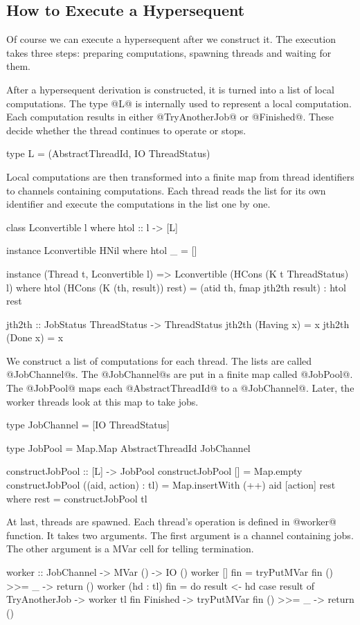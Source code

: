 \documentclass[doctor]{iscs-thesis}
\begin{document}
\subsection{How to Execute a Hypersequent}
Of course we can execute a hypersequent after we construct it.  The
execution takes three steps: preparing computations, spawning
threads and waiting for them.

After a hypersequent derivation is constructed, it is turned into a list
of local computations.  The type @L@ is internally used to represent a
local computation.  Each computation results in either @TryAnotherJob@
or @Finished@.  These decide whether the thread continues to operate or stops.
\begin{code}
type L = (AbstractThreadId, IO ThreadStatus)
\end{code}

Local computations are then transformed into a finite map from thread
identifiers to channels containing computations. Each thread reads the list for
its own identifier and execute the computations in the list one by one. 
\begin{code}
class Lconvertible l where
    htol :: l -> [L]

instance Lconvertible HNil where
    htol _ = []

instance (Thread t, Lconvertible l) =>
 Lconvertible (HCons (K t ThreadStatus) l) where
    htol (HCons (K (th, result)) rest) =
      (atid th, fmap jth2th result) : htol rest

jth2th :: JobStatus ThreadStatus -> ThreadStatus 
jth2th (Having x) = x
jth2th (Done x) = x 
\end{code}

We construct a list of computations for each thread.  The lists are
called @JobChannel@s.  The @JobChannel@s are put in a finite map called
@JobPool@.  The @JobPool@ maps each @AbstractThreadId@ to a
@JobChannel@.  Later, the worker threads look at this map to take jobs.
\begin{code}
type JobChannel = [IO ThreadStatus]

type JobPool = 
    Map.Map AbstractThreadId JobChannel

constructJobPool :: [L] -> JobPool
constructJobPool [] = Map.empty
constructJobPool ((aid, action) : tl) =
  Map.insertWith (++) aid [action] rest
     where
       rest = constructJobPool tl
\end{code}

At last, threads are spawned.  Each thread's operation is defined in
@worker@ function.  It takes two arguments.  The first argument is a
channel containing jobs.  The other argument is a MVar cell for telling
termination.
\begin{code}
worker :: JobChannel -> MVar () -> IO ()
worker [] fin = tryPutMVar fin () >>= \_ -> return ()
worker (hd : tl) fin = do
  result <- hd
  case result of
    TryAnotherJob -> worker tl fin
    Finished -> tryPutMVar fin () >>= \_ -> return ()
\end{code}
\end{document}
